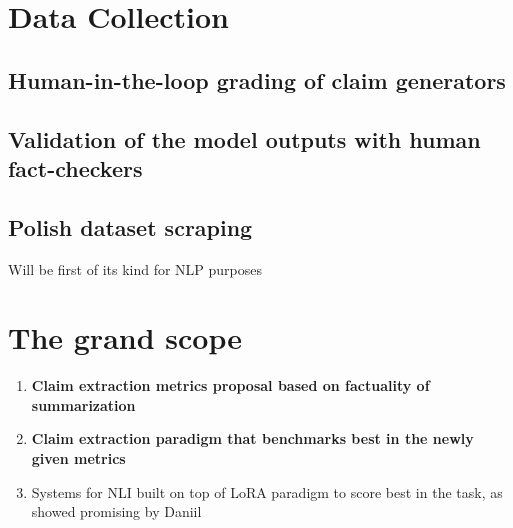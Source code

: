 \section{Data Collection}
\subsection{Human-in-the-loop grading of claim generators}
\subsection{Validation of the model outputs with human fact-checkers}
\subsection{Polish dataset scraping}
Will be first of its kind for NLP purposes

\section{The grand scope}
\begin{enumerate}
    \item \textbf{Claim extraction metrics proposal based on factuality of summarization}
    \item \textbf{Claim extraction paradigm that benchmarks best in the newly given metrics}
    \item Systems for NLI built on top of LoRA paradigm to score best in the task, as showed promising by Daniil
    
\end{enumerate}